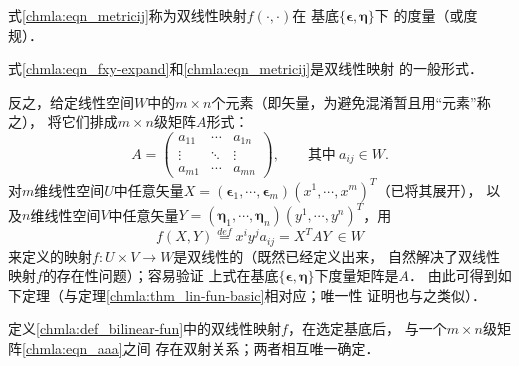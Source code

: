 \begin{definition}
    式\eqref{chmla:eqn_metricij}称为双线性映射$f(\cdot,\cdot)$在
    基底$\{\boldsymbol{\epsilon},\boldsymbol{\eta}\}$下
    的{\heiti 度量}（或{\heiti 度规}）．
     
\end{definition}
式\eqref{chmla:eqn_fxy-expand}和\eqref{chmla:eqn_metricij}是双线性映射
的一般形式．

反之，给定线性空间$W$中的$m\times n$个元素（即矢量，为避免混淆暂且用“元素”称之），
将它们排成$m\times n$级矩阵$A$形式：
\begin{equation}
    A = \begin{pmatrix}\label{chmla:eqn_aaa}
        a_{11} & \cdots & a_{1n} \\
        \vdots & \ddots & \vdots \\
        a_{m1} & \cdots & a_{mn}
    \end{pmatrix},
    \qquad \text{其中}\ a_{ij}\in W .
\end{equation}
对$m$维线性空间$U$中任意矢量$X=(\boldsymbol{\epsilon}_1, \cdots,
\boldsymbol{\epsilon}_m) (x^1,\cdots,x^m)^T$（已将其展开），
以及$n$维线性空间$V$中任意矢量$Y=(\boldsymbol{\eta}_1, \cdots,
\boldsymbol{\eta}_n) (y^1,\cdots,y^n)^T$，用
\begin{equation}\label{chmla:eqn_bi-fun-form}
    f(X,Y) \overset{def}{=} x^i y^j a_{ij} = X^T A Y \ \in W
\end{equation}
来定义的映射$f:U \times V \to W $是双线性的（既然已经定义出来，
自然解决了双线性映射$f$的存在性问题）；容易验证
上式在基底$\{\boldsymbol{\epsilon},\boldsymbol{\eta}\}$下度量矩阵是$A$．
由此可得到如下定理（与定理\ref{chmla:thm_lin-fun-basic}相对应；唯一性
证明也与之类似）．

\begin{theorem}\label{chmla:thm_bifunmatrix}
定义\ref{chmla:def_bilinear-fun}中的双线性映射$f$，在选定基底后，
与一个$m\times n$级矩阵\eqref{chmla:eqn_aaa}之间
存在双射关系；两者相互唯一确定．
\end{theorem}

